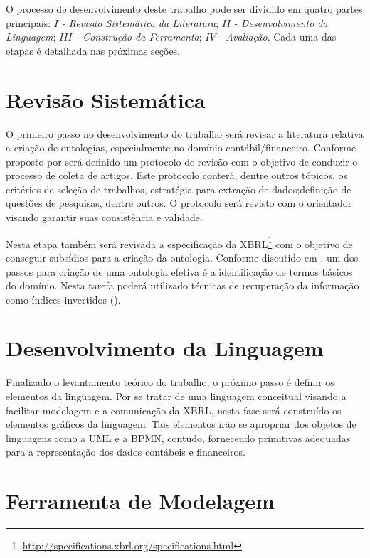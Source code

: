 \documentclass[msc,proposal,hidelot,hideabstract]{ppgccufmg} %
\begin{document}
O processo de desenvolvimento deste trabalho pode ser dividido em quatro partes principais: $I$\textit{ - Revisão Sistemática da Literatura}; $II$\textit{ - Desenvolvimento da Linguagem}; $III$\textit{ - Construção da Ferramenta}; $IV$\textit{ - Avaliação}. Cada uma das etapas é detalhada nas próximas seções.

\section{Revisão Sistemática}
\label{sec:revisao_sistematica}

O primeiro passo no desenvolvimento do trabalho será revisar a literatura relativa a criação de ontologias, especialmente no domínio contábil/financeiro. Conforme proposto por \cite{wohlin2012experimentation} será definido um protocolo de revisão com o objetivo de conduzir o processo de coleta de artigos. Este protocolo conterá, dentre outros tópicos, os critérios de seleção de trabalhos, estratégia para extração de dados;definição de questões de pesquisas, dentre outros. O protocolo será revisto com o orientador visando garantir suas consistência e validade.

Nesta etapa também será revisada a especificação da XBRL\footnote{\url{http://specifications.xbrl.org/specifications.html}} com o objetivo de conseguir subsídios para a criação da ontologia. Conforme discutido em \cite{lupacsc2010role}{}, um dos passos para criação de uma ontologia efetiva é a identificação de termos básicos do domínio. Nesta tarefa poderá utilizado técnicas de recuperação da informação como índices invertidos (\cite{baeza1999modern}).

\section{Desenvolvimento da Linguagem}
\label{sec:dese_lingugem}

Finalizado o levantamento teórico do trabalho, o próximo passo é definir os elementos da linguagem. Por se tratar de uma linguagem conceitual visando a facilitar modelagem e a comunicação da XBRL, nesta fase será construído os elementos gráficos da linguagem. Tais elementos irão se apropriar dos objetos de linguagens como a UML e a BPMN, contudo, fornecendo primitivas adequadas para a representação dos dados contábeis e financeiros.

\section{Ferramenta de Modelagem}
\label{sec:ferramenta}
\end{document}
